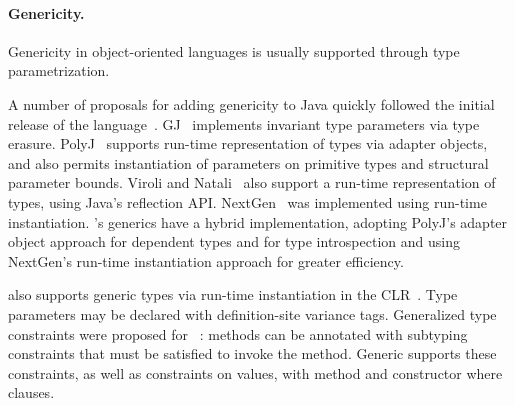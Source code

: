 

\paragraph{Genericity.}

Genericity in object-oriented languages is usually
supported through
type parametrization.

A number of proposals 
for adding genericity to Java quickly followed
the initial release of
the language~\cite{GJ,java-popl97,thorup97,allen03}.
GJ~\cite{GJ} implements invariant type
parameters via type erasure.
PolyJ~\cite{java-popl97} supports run-time representation of types
via adapter objects, and also permits instantiation of
parameters on primitive types and structural parameter bounds.
Viroli and Natali~\cite{reflective-generics,type-passing-generics}
also support
a run-time representation of types, using Java's reflection API.
NextGen~\cite{nextgen,allen03} was implemented using run-time 
instantiation.
\Xten{}'s generics have a hybrid implementation, adopting PolyJ's
adapter object approach for dependent types and for 
type introspection and using NextGen's run-time
instantiation approach for greater efficiency.

\csharp also supports generic types via run-time instantiation in the
CLR~\cite{csharp-generics}.  Type parameters may be declared
with definition-site variance tags.
Generalized type constraints were proposed for
\csharp~\cite{emir06}: methods can be annotated with subtyping
constraints that must be satisfied to invoke the method.
Generic \Xten{} supports these constraints, as well as constraints
on values, with method and constructor where clauses.



